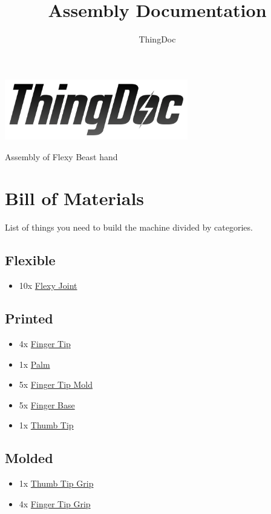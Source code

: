 \documentclass[11pt]{article}
\title{Assembly Documentation}
\author{ThingDoc}
\begin{document}
\maketitle
\begin{center}
\includegraphics[width=8cm]{logo.png}
\end{center}
Assembly of Flexy Beast hand

\newpage

\tableofcontents

\newpage

\section{Bill of Materials}
List of things you need to build the machine divided by categories.

\subsection{Flexible}
\begin{itemize}
\item 10x \hyperlink{thing_flexy\_joint}{Flexy Joint}
\end{itemize}

\subsection{Printed}
\begin{itemize}
\item 4x \hyperlink{thing_finger\_tip}{Finger Tip}
\item 1x \hyperlink{thing_palm}{Palm}
\item 5x \hyperlink{thing_finger\_tip\_mold}{Finger Tip Mold}
\item 5x \hyperlink{thing_finger\_base}{Finger Base}
\item 1x \hyperlink{thing_thumb\_tip}{Thumb Tip}
\end{itemize}

\subsection{Molded}
\begin{itemize}
\item 1x \hyperlink{thing_thumb\_tip\_grip}{Thumb Tip Grip}
\item 4x \hyperlink{thing_finger\_tip\_grip}{Finger Tip Grip}
\end{itemize}
\end{document}
